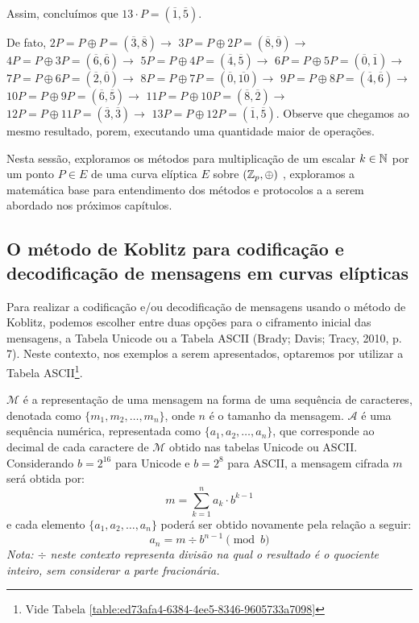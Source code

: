 \begin{exemplo}
	\justify
	Assim, concluímos que $13 \cdot P = (\overline{1},\overline{5}) $.

	De fato, $2P = P \oplus P = (\overline{3},\overline{8}) \rightarrow$ $3P = P
		\oplus 2P = (\overline{8},\overline{9}) \rightarrow $ $4P = P \oplus 3P =
		(\overline{6},\overline{6}) \rightarrow$ $5P = P \oplus 4P =
		(\overline{4},\overline{5}) \rightarrow$ $6P = P \oplus 5P =
		(\overline{0},\overline{1}) \rightarrow$ $7P = P \oplus 6P =
		(\overline{2},\overline{0}) \rightarrow$ $8P = P \oplus 7P =
		(\overline{0},\overline{10}) \rightarrow $ $9P = P \oplus 8P =
		(\overline{4},\overline{6}) \rightarrow$ $ 10P = P \oplus 9P =
		(\overline{6},\overline{5}) \rightarrow $ $ 11P = P \oplus 10P =
		(\overline{8},\overline{2}) \rightarrow $ $ 12P = P \oplus 11P =
		(\overline{3},\overline{3}) \rightarrow $ $ 13P = P \oplus 12P =
		(\overline{1},\overline{5})$. Observe que chegamos ao mesmo resultado, porem,
	executando uma quantidade maior de operações.
\end{exemplo}

Nesta sessão, exploramos os métodos para multiplicação de um escalar $k \in \mathbb{N}$
por um ponto $P \in E$ de uma curva elíptica $E$ sobre $(\mathbb{Z}_p, \oplus)$ ,
exploramos a matemática base para entendimento dos métodos e protocolos a a
serem abordado nos próximos capítulos.

\subsection{O método de Koblitz para codificação e decodificação de mensagens em curvas elípticas} \label{subsec:bfed5d67-dd66-4e04-95c2-bcb2db8b0000}

Para realizar a codificação e/ou decodificação de mensagens usando o método de
Koblitz, podemos escolher entre duas opções para o ciframento inicial das
mensagens, a Tabela Unicode ou a Tabela ASCII (Brady; Davis; Tracy, 2010, p.
7). Neste contexto, nos exemplos a serem apresentados, optaremos por utilizar a
Tabela ASCII\footnote{Vide Tabela
	\ref{table:ed73afa4-6384-4ee5-8346-9605733a7098}}.

\begin{definicao}\label{definicao:6c615379-1811-4204-9b1c-fbe2862d9d14}
	$\mathcal{M}$ é a representação de uma mensagem na forma de uma sequência de caracteres, denotada como $\{m_1, m_2, \ldots, m_n\}$, onde $n$ é o tamanho da mensagem. $\mathcal{A} $ é uma sequência numérica, representada como $\{a_1, a_2, \ldots, a_n\}$, que corresponde ao decimal de cada caractere de $\mathcal{M}$ obtido nas tabelas  Unicode ou ASCII. Considerando $b = 2^{16}$ para Unicode e $b = 2^8$ para ASCII, a mensagem cifrada $m$ será obtida por:
	\begin{equation}
		m= \sum_{k=1}^{n} a_k \cdot b^{k-1}
	\end{equation}
	e cada elemento $\{a_1, a_2, \ldots, a_n\}$ poderá ser obtido novamente pela relação a seguir:
	\begin{equation}
		a_n = m \div b^{n-1}   \pmod{b}
	\end{equation}
	\textit{Nota:  $\div $ neste contexto representa divisão na qual o resultado é o quociente inteiro, sem considerar a parte fracionária. }
\end{definicao}


